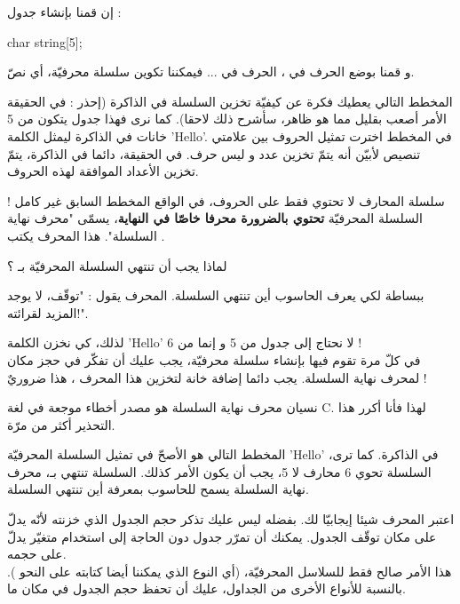 إن قمنا بإنشاء جدول :
\begin{Csource}
char string[5];
\end{Csource}
و قمنا بوضع الحرف
في
،
الحرف
في
...
فيمكننا تكوين سلسلة محرفيّة، أي نصّ.

المخطط التالي يعطيك فكرة عن كيفيّة تخزين السلسلة في الذاكرة (إحذر : في الحقيقة الأمر أصعب بقليل مما هو ظاهر، سأشرح ذلك لاحقا).
كما نرى فهذا جدول يتكون من 5 خانات في الذاكرة ليمثل الكلمة
'\textenglish{Hello}'.
في المخطط اخترت تمثيل الحروف بين علامتي تنصيص  لأبيّن أنه يتمّ تخزين عدد و ليس حرف. في الحقيقة، دائما في الذاكرة، يتمّ تخزين الأعداد الموافقة لهذه الحروف.

سلسلة المحارف لا تحتوي فقط على الحروف، في الواقع المخطط السابق غير كامل !
السلسلة المحرفيّة
\textbf{تحتوي بالضرورة محرفا خاصّا في النهاية}،
يسمّى "محرف نهاية السلسلة". هذا المحرف يكتب
.
\begin{question}
  لماذا يجب أن تنتهي السلسلة المحرفيّة بـ ؟
\end{question}
ببساطة لكي يعرف الحاسوب أين تنتهي السلسلة. المحرف
يقول : "توقّف، لا يوجد المزيد لقرائته!".

لذلك، كي نخزن الكلمة
\textenglish{'Hello'}
 لا نحتاج إلى جدول من 5
و إنما من 6 !\\
في كلّ مرة تقوم فيها بإنشاء سلسلة محرفيّة، يجب عليك أن تفكّر في حجز مكان لمحرف نهاية السلسلة. يجب دائما إضافة خانة لتخزين هذا المحرف
،
هذا ضروريٌ !

نسيان محرف نهاية السلسلة
هو مصدر أخطاء موجعة في لغة
\textenglish{C}.
لهذا فأنا أكرر هذا التحذير أكثر من مرّة.

المخطط التالي هو الأصحّ في تمثيل السلسلة المحرفيّة
'\textenglish{Hello}'
في الذاكرة.
كما ترى، السلسلة تحوي 6 محارف لا 5، يجب أن يكون الأمر كذلك. السلسلة تنتهي بـ،
محرف نهاية السلسلة يسمح للحاسوب بمعرفة أين تنتهي السلسلة.

اعتبر المحرف
شيئا إيجابيّا لك. بفضله ليس عليك تذكر حجم الجدول الذي خزنته لأنّه يدلّ على مكان توقّف الجدول. يمكنك أن تمرّر جدول
دون الحاجة إلى استخدام متغيّر يدلّ على حجمه.\\
هذا الأمر صالح فقط للسلاسل المحرفيّة، (أي النوع
الذي يمكننا أيضا كتابته على النحو
).
بالنسبة للأنواع الأخرى من الجداول، عليك أن تحفظ حجم الجدول في مكان ما.
